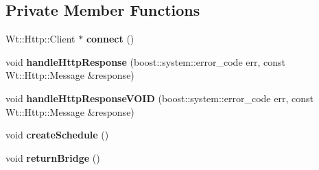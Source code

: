 \subsection*{Private Member Functions}
\begin{DoxyCompactItemize}
\item 
Wt\+::\+Http\+::\+Client $\ast$ {\bfseries connect} ()\hypertarget{classSchedulerControlWidget_ace95dce867b19128d2ac1d9b7f6af2df}{}\label{classSchedulerControlWidget_ace95dce867b19128d2ac1d9b7f6af2df}

\item 
void {\bfseries handle\+Http\+Response} (boost\+::system\+::error\+\_\+code err, const Wt\+::\+Http\+::\+Message \&response)\hypertarget{classSchedulerControlWidget_a9b2cb5e76ca840104928a5016741cd4c}{}\label{classSchedulerControlWidget_a9b2cb5e76ca840104928a5016741cd4c}

\item 
void {\bfseries handle\+Http\+Response\+V\+O\+ID} (boost\+::system\+::error\+\_\+code err, const Wt\+::\+Http\+::\+Message \&response)\hypertarget{classSchedulerControlWidget_a608cf1aa0348a5a9db24b199136beff6}{}\label{classSchedulerControlWidget_a608cf1aa0348a5a9db24b199136beff6}

\item 
void {\bfseries create\+Schedule} ()\hypertarget{classSchedulerControlWidget_afbf344c96240de973c3f4bdc2f49c23c}{}\label{classSchedulerControlWidget_afbf344c96240de973c3f4bdc2f49c23c}

\item 
void {\bfseries return\+Bridge} ()\hypertarget{classSchedulerControlWidget_a3f4447117c1338a01e90c582f2666713}{}\label{classSchedulerControlWidget_a3f4447117c1338a01e90c582f2666713}

\end{DoxyCompactItemize}
